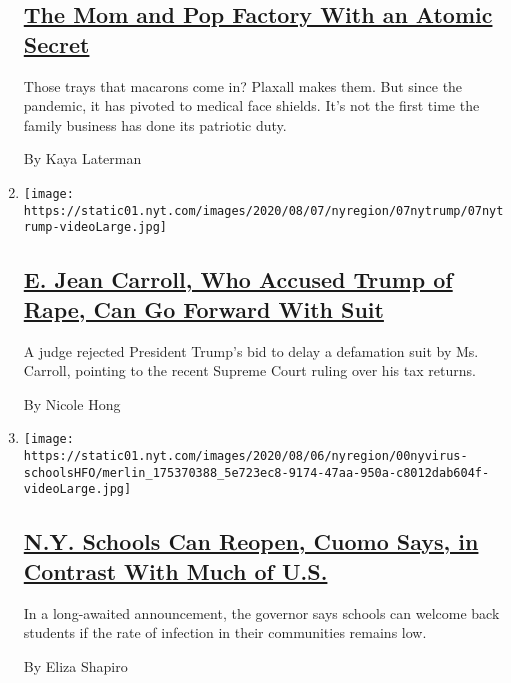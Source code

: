 \begin{enumerate}
  \hypertarget{the-mom-and-pop-factory-with-an-atomic-secret}{%
  \subsection{\texorpdfstring{\href{/2020/08/07/nyregion/coronavirus-ppe-nyc-face-shields.html}{The
  Mom and Pop Factory With an Atomic
  Secret}}{The Mom and Pop Factory With an Atomic Secret}}\label{the-mom-and-pop-factory-with-an-atomic-secret}}

  Those trays that macarons come in? Plaxall makes them. But since the
  pandemic, it has pivoted to medical face shields. It's not the first
  time the family business has done its patriotic duty.

  By Kaya Laterman
\item
  \texttt{[image: https://static01.nyt.com/images/2020/08/07/nyregion/07nytrump/07nytrump-videoLarge.jpg]}

  \hypertarget{e-jean-carroll-who-accused-trump-of-rape-can-go-forward-with-suit}{%
  \subsection{\texorpdfstring{\href{/2020/08/07/nyregion/jean-caroll-donald-trump-lawsuit-rape.html}{E.
  Jean Carroll, Who Accused Trump of Rape, Can Go Forward With
  Suit}}{E. Jean Carroll, Who Accused Trump of Rape, Can Go Forward With Suit}}\label{e-jean-carroll-who-accused-trump-of-rape-can-go-forward-with-suit}}

  A judge rejected President Trump's bid to delay a defamation suit by
  Ms. Carroll, pointing to the recent Supreme Court ruling over his tax
  returns.

  By Nicole Hong
\item
  \texttt{[image: https://static01.nyt.com/images/2020/08/06/nyregion/00nyvirus-schoolsHFO/merlin\_175370388\_5e723ec8-9174-47aa-950a-c8012dab604f-videoLarge.jpg]}

  \hypertarget{ny-schools-can-reopen-cuomo-says-in-contrast-with-much-of-us}{%
  \subsection{\texorpdfstring{\href{/2020/08/07/nyregion/cuomo-schools-reopening.html}{N.Y.
  Schools Can Reopen, Cuomo Says, in Contrast With Much of
  U.S.}}{N.Y. Schools Can Reopen, Cuomo Says, in Contrast With Much of U.S.}}\label{ny-schools-can-reopen-cuomo-says-in-contrast-with-much-of-us}}

  In a long-awaited announcement, the governor says schools can welcome
  back students if the rate of infection in their communities remains
  low.

  By Eliza Shapiro
\end{enumerate}

